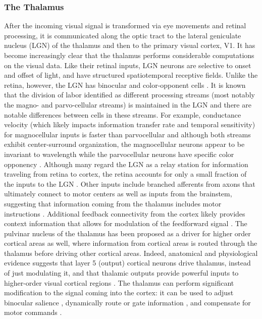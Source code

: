 \subsubsection{The Thalamus}
After the incoming visual signal is transformed via eye movements and retinal processing, it is communicated along the optic tract to the lateral geniculate nucleus (LGN) of the thalamus and then to the primary visual cortex, V1. It has become increasingly clear that the thalamus performs considerable computations on the visual data. Like their retinal inputs, LGN neurons are selective to onset and offset of light, and have structured spatiotemporal receptive fields. Unlike the retina, however, the LGN has binocular and color-opponent cells \parencite{schiller1978functional, schmielau1977role}. It is known that the division of labor identified as different processing streams (most notably the magno- and parvo-cellular streams) is maintained in the LGN and there are notable differences between cells in these streams. For example, conductance velocity (which likely impacts information transfer rate and temporal sensitivity) for magnocellular inputs is faster than parvocellular and although both streams exhibit center-surround organization, the magnocellular neurons appear to be invariant to wavelength while the parvocellular neurons have specific color opponency \parencite{schiller1978functional}. Although many regard the LGN as a relay station for information traveling from retina to cortex, the retina accounts for only a small fraction of the inputs to the LGN \parencite{weyand2016multifunctional}. Other inputs include branched afferents from axons that ultimately connect to motor centers as well as inputs from the brainstem, suggesting that information coming from the thalamus includes motor instructions \parencite{guillery2002thalamic}. Additional feedback connectivity from the cortex likely provides context information that allows for modulation of the feedforward signal \parencite{weyand2016multifunctional, ghodrati2017towards}. The pulvinar nucleus of the thalamus has been proposed as a driver for higher order cortical areas as well, where information from cortical areas is routed through the thalamus before driving other cortical areas. Indeed, anatomical and physiological evidence suggests that layer 5 (output) cortical neurons drive thalamus, instead of just modulating it, and that thalamic outputs provide powerful inputs to higher-order visual cortical regions \parencite{guillery2002thalamic}. The thalamus can perform significant modification to the signal coming into the cortex: it can be used to adjust binocular salience \parencite{schmielau1977role}, dynamically route or gate information \parencite{olshausen1993neurobiological, weyand2016multifunctional}, and compensate for motor commands \parencite{guillery2011branched}.


